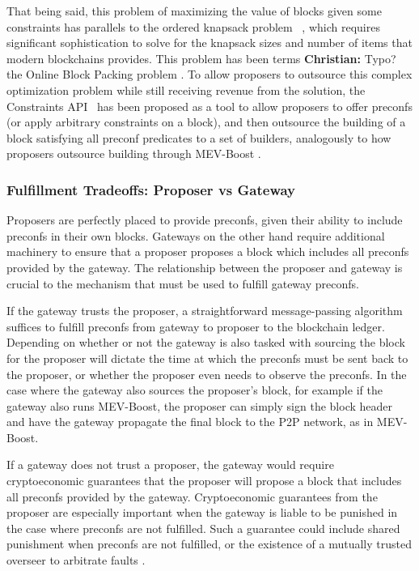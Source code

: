 \documentclass[a4paper]{article}
\theoremstyle{boldstyle}
\newcommand{\chm}[1]{\textcolor{OliveGreen}{\textbf{Christian:} #1}}
\begin{document}
That being said, this problem of maximizing the value of blocks given some constraints has parallels to the ordered knapsack problem ~\cite{P:Partiallyorderedknapsackandapplicationstoscheculing}, which requires significant sophistication to solve for the knapsack sizes and number of items that modern blockchains provides. This problem has been terms \chm{Typo?} the Online Block Packing problem \cite{OnlineBlockPacking}. To allow proposers to outsource this complex optimization problem while still receiving revenue from the solution, the Constraints API~\cite{W:ConstraintsAPISpecification} has been proposed as a tool to allow proposers to offer preconfs (or apply arbitrary constraints on a block), and then outsource the building of a block satisfying all preconf predicates to a set of builders, analogously to how proposers outsource building through MEV-Boost \cite{MEV-Boost}. 

\subsubsection{Fulfillment Tradeoffs: Proposer vs Gateway}
\label{delivery_tradeoffs}

Proposers are perfectly placed to provide preconfs, given their ability to include preconfs in their own blocks. Gateways on the other hand require additional machinery to ensure that a proposer proposes a block which includes all preconfs provided by the gateway. The relationship between the proposer and gateway is crucial to the mechanism that must be used to fulfill gateway preconfs. 

If the gateway trusts the proposer, a straightforward message-passing algorithm suffices to fulfill preconfs from gateway to proposer to the blockchain ledger. Depending on whether or not the gateway is also tasked with sourcing the block for the proposer will dictate the time at which the preconfs must be sent back to the proposer, or whether the proposer even needs to observe the preconfs. In the case where the gateway also sources the proposer's block, for example if the gateway also runs MEV-Boost, the proposer can simply sign the block header and have the gateway propagate the final block to the P2P network, as in MEV-Boost.

If a gateway does not trust a proposer, the gateway would require cryptoeconomic guarantees that the proposer will propose a block that includes all preconfs provided by the gateway. Cryptoeconomic guarantees from the proposer are especially important when the gateway is liable to be punished in the case where preconfs are not fulfilled. Such a guarantee could include shared punishment when preconfs are not fulfilled, or the existence of a mutually trusted overseer to arbitrate faults \cite{W:PreconfirmationFairExchange,W:FaultAttribution}. 
\end{document}
